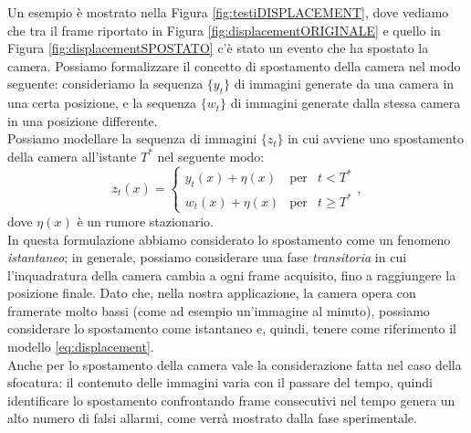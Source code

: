 \noindent Un esempio \`e mostrato nella Figura \ref{fig:testiDISPLACEMENT}, dove vediamo che tra il frame riportato in Figura \ref{fig:displacementORIGINALE} e quello in Figura \ref{fig:displacementSPOSTATO} c'\`e stato un evento che ha spostato la camera.
Possiamo formalizzare il concetto di spostamento della camera nel modo seguente: consideriamo la sequenza $\{y_t\}$ di immagini generate da una camera in una certa posizione, e la sequenza $\{w_t\}$ di immagini generate dalla stessa camera in una posizione differente.\\
Possiamo modellare la sequenza di immagini $\{z_t\}$ in cui avviene uno spostamento della camera all'istante $T^*$ nel seguente modo:
\begin{equation}
\label{eq:displacement}
z_t(x)  = \left\{ \begin{array}{rcl}
	y_t(x) + \eta(x) & \mbox{per} & t < T^* \\
	w_t(x) + \eta(x) & \mbox{per} & t \geqslant T^*
	\end{array}\right. ,
\end{equation}
dove $\eta(x)$ \`e un rumore stazionario.\\
In questa formulazione abbiamo considerato lo spostamento come un fenomeno \textit{istantaneo};
in generale, possiamo considerare una fase \textit{transitoria} in cui l'inquadratura della camera cambia a ogni \gls{frame} acquisito, fino a raggiungere la posizione finale. 
Dato che, nella nostra applicazione, la camera opera con \gls{framerate} molto bassi (come ad esempio un'immagine al minuto), possiamo considerare lo spostamento come istantaneo e, quindi, tenere come riferimento il modello \eqref{eq:displacement}.\\
Anche per lo spostamento della camera vale la considerazione fatta nel caso della sfocatura: il contenuto delle immagini varia con il passare del tempo, quindi identificare lo spostamento confrontando frame consecutivi nel tempo genera un alto numero di falsi allarmi, come verr\`a mostrato dalla fase sperimentale.
